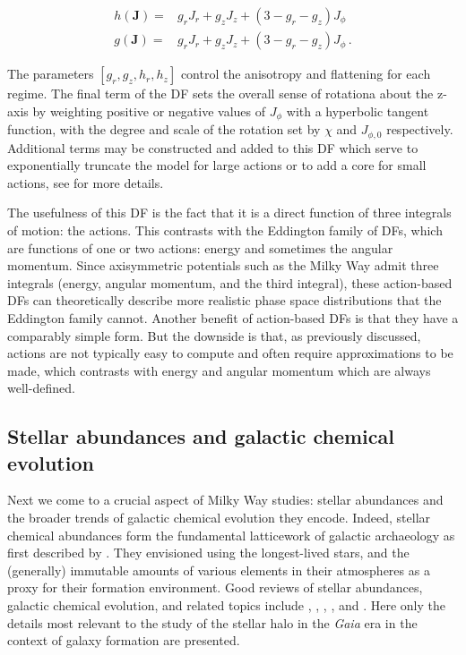 \begin{equation}
\label{ch1:eq:action-df-flattening-anisotropy}
\begin{split}
    h(\mathbf{J}) = & g_{r} J_{r} + g_{z} J_{z} + (3-g_{r}-g_{z}) J_{\phi} \\
    g(\mathbf{J}) = & g_{r} J_{r} + g_{z} J_{z} + (3-g_{r}-g_{z}) J_{\phi}\,.
\end{split}
\end{equation}

\noindent The parameters $[g_{r}, g_{z}, h_{r}, h_{z}]$ control the anisotropy and flattening for each regime. The final term of the DF sets the overall sense of rotationa about the z-axis by weighting positive or negative values of $J_{\phi}$ with a hyperbolic tangent function, with the degree and scale of the rotation set by $\chi$ and $J_{\phi,0}$ respectively. Additional terms may be constructed and added to this DF which serve to exponentially truncate the model for large actions or to add a core for small actions, see \textcite{binney14d} for more details.

The usefulness of this DF is the fact that it is a direct function of three integrals of motion: the actions. This contrasts with the Eddington family of DFs, which are functions of one or two actions: energy and sometimes the angular momentum. Since axisymmetric potentials such as the Milky Way admit three integrals (energy, angular momentum, and the third integral), these action-based DFs can theoretically describe more realistic phase space distributions that the Eddington family cannot. Another benefit of action-based DFs is that they have a comparably simple form. But the downside is that, as previously discussed, actions are not typically easy to compute and often require approximations to be made, which contrasts with energy and angular momentum which are always well-defined.

\subsection{Stellar abundances and galactic chemical evolution}

Next we come to a crucial aspect of Milky Way studies: stellar abundances and the broader trends of galactic chemical evolution they encode. Indeed, stellar chemical abundances form the fundamental latticework of galactic archaeology as first described by \textcite{freeman02}. They envisioned using the longest-lived stars, and the (generally) immutable amounts of various elements in their atmospheres as a proxy for their formation environment. Good reviews of stellar abundances, galactic chemical evolution, and related topics include  \textcite{tolstoy09}, \textcite{asplund09}, \textcite{nomoto13}, \textcite{frebel15}, and \textcite{kobayashi23}. Here only the details most relevant to the study of the stellar halo in the \textit{Gaia} era in the context of galaxy formation are presented.

